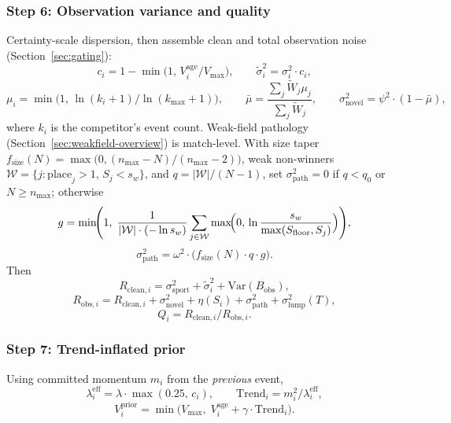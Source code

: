 \documentclass[12pt]{article}
\newcommand{\sigmai}{\sigma_i^2}
\newcommand{\ssport}{\sigma_{\mathrm{sport}}^2}      %
\newcommand{\vmax}{V_{\mathrm{max}}}
\newcommand{\psii}{\psi^2}
\newcommand{\omegai}{\omega^2}
\newcommand{\slump}{\sigma_{\mathrm{lump}}^2}  %
\newcommand{\gammad}{\gamma}    %
\newcommand{\lambdad}{\lambda}  %
\newcommand{\kmax}{k_{\mathrm{max}}}
\newcommand{\bobs}{B_{\mathrm{obs}}}
\begin{document}
	\subsubsection*{Step 6: Observation variance and quality}
	\label{step6}
	Certainty-scale dispersion, then assemble clean and total observation noise (Section~\ref{sec:gating}):
	\begin{equation}
		c_i = 1 - \min\!\bigl(1,\, V_i^{\mathrm{age}} / \vmax\bigr), \qquad
		\tilde{\sigma}_i^2 = \sigmai \cdot c_i,
	\end{equation}
	\begin{equation}
		\mu_i = \min\!\bigl(1,\, \ln(k_i+1)/\ln(\kmax+1)\bigr), \qquad
		\bar{\mu} = \frac{\sum_j \tilde{W}_j \mu_j}{\sum_j \tilde{W}_j}, \qquad
		\sigma_{\mathrm{novel}}^2 = \psii \cdot (1 - \bar{\mu}),
	\end{equation}
	where $k_i$ is the competitor's event count. Weak-field pathology (Section~\ref{sec:weakfield-overview}) is match-level.\label{sec:weakfield} With size taper $f_{\mathrm{size}}(N) = \max\bigl(0, (n_{\mathrm{max}}-N)/(n_{\mathrm{max}}-2)\bigr)$, weak non-winners $\mathcal{W} = \{j : \mathrm{place}_j > 1,\, S_j < s_w\}$, and $q = |\mathcal{W}|/(N-1)$, set $\sigma_{\mathrm{path}}^2 = 0$ if $q < q_0$ or $N \ge n_{\mathrm{max}}$; otherwise
	\begin{equation}
		g = \min\!\Biggl(1,\; \frac{1}{|\mathcal{W}| \cdot (-\ln s_w)} \sum_{j \in \mathcal{W}} \max\!\Bigl(0,\, \ln\frac{s_w}{\max(S_{\mathrm{floor}}, S_j)}\Bigr)\Biggr),
	\end{equation}
	\begin{equation}
		\sigma_{\mathrm{path}}^2 = \omegai \cdot \bigl(f_{\mathrm{size}}(N) \cdot q \cdot g\bigr).
	\end{equation}
	Then
	\begin{equation}
		R_{\mathrm{clean},i} = \ssport + \tilde{\sigma}_i^2 + \mathrm{Var}(\bobs),
	\end{equation}
	\begin{equation}
		R_{\mathrm{obs},i} = R_{\mathrm{clean},i} + \sigma_{\mathrm{novel}}^2 + \eta(S_i) + \sigma_{\mathrm{path}}^2 + \slump(T),
	\end{equation}
	\begin{equation}
		Q_i = R_{\mathrm{clean},i} / R_{\mathrm{obs},i}.
	\end{equation}

	\subsubsection*{Step 7: Trend-inflated prior}
	Using committed momentum $m_i$ from the \emph{previous} event,
	\begin{equation}
		\lambdad_i^{\mathrm{eff}} = \lambdad \cdot \max(0.25,\, c_i), \qquad
		\mathrm{Trend}_i = m_i^2 / \lambdad_i^{\mathrm{eff}},
	\end{equation}
	\begin{equation}
		V_i^{\mathrm{prior}} = \min\bigl(\vmax,\; V_i^{\mathrm{age}} + \gammad \cdot \mathrm{Trend}_i\bigr).
	\end{equation}
\end{document}
